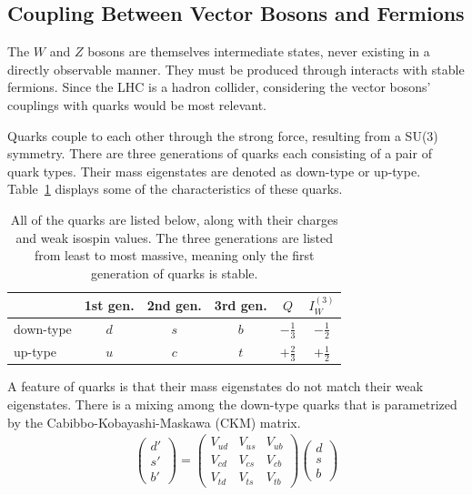 \subsection{Coupling Between Vector Bosons and Fermions} \label{sec:produce-vector}

The $W$ and $Z$ bosons are themselves intermediate states,
never existing in a directly observable manner.
They must be produced through interacts with stable fermions.
Since the LHC is a hadron collider,
considering the vector bosons' couplings with quarks would be most relevant.

Quarks couple to each other through the strong force,
resulting from a SU(3) symmetry.
There are three generations of quarks each consisting of a pair of quark types.
Their mass eigenstates are denoted as down-type or up-type.
Table~\ref{tab:quarks} displays some of the characteristics of these quarks.
\begin{table}
  \centering
  \caption[Quark flavors]{
    All of the quarks are listed below,
    along with their charges and weak isospin values.
    The three generations are listed from least to most massive,
    meaning only the first generation of quarks is stable.
  }
  {\renewcommand{\arraystretch}{1.5}
  \begin{tabular}{|l|c c c c c|}
    \hline
    & 1st gen. & 2nd gen. & 3rd gen. & $Q$ & $I_W^{(3)}$ \\
    \hline
    down-type & $d$ & $s$ & $b$ & $-\frac13$ & $-\frac12$ \\
    up-type & $u$ & $c$ & $t$ & $+\frac23$ & $+\frac12$ \\
    \hline
  \end{tabular}}
  \label{tab:quarks}
\end{table}
A feature of quarks is that their mass eigenstates do not match their weak eigenstates.
There is a mixing among the down-type quarks that is parametrized by the
Cabibbo-Kobayashi-Maskawa (CKM) matrix.
\begin{gather}
  \left(
  \begin{matrix}
    d' \\
    s' \\
    b'
  \end{matrix}
  \right)
  =
  \left(
  \begin{matrix}
    V_{ud} & V_{us} & V_{ub} \\
    V_{cd} & V_{cs} & V_{cb} \\
    V_{td} & V_{ts} & V_{tb}
  \end{matrix}
  \right)
  \left(
  \begin{matrix}
    d \\
    s \\
    b
  \end{matrix}
  \right) \label{eq:ckm}
\end{gather}
